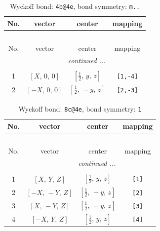 \documentclass[fleqn,8pt]{jsarticle}
\begin{document}
\renewcommand{\arraystretch}{1.2}
\begin{longtable}{cccc}
\caption{Wyckoff bond: {\tt 4b@4e}, bond symmetry: {\tt m..}}
 \\
 \hline \hline
No. & vector & center & mapping \\ \hline \endfirsthead

\multicolumn{3}{l}{\tablename\ \thetable{}} \\
 \hline \hline
No. & vector & center & mapping \\ \hline \endhead

 \hline \hline
\multicolumn{3}{r}{\footnotesize\it continued ...} \\ \endfoot

 \hline \hline
\multicolumn{3}{r}{} \\ \endlastfoot

1 & $\left[ X,\, 0,\, 0 \right]$ & $\left[ \frac{1}{2},\, y,\, z \right]$ & {\tt [1,-4]} \\ \hline
2 & $\left[ - X,\, 0,\, 0 \right]$ & $\left[ \frac{1}{2},\, - y,\, z \right]$ & {\tt [2,-3]} \\
\end{longtable}
\renewcommand{\arraystretch}{1.2}
\begin{longtable}{cccc}
\caption{Wyckoff bond: {\tt 8c@4e}, bond symmetry: {\tt 1}}
 \\
 \hline \hline
No. & vector & center & mapping \\ \hline \endfirsthead

\multicolumn{3}{l}{\tablename\ \thetable{}} \\
 \hline \hline
No. & vector & center & mapping \\ \hline \endhead

 \hline \hline
\multicolumn{3}{r}{\footnotesize\it continued ...} \\ \endfoot

 \hline \hline
\multicolumn{3}{r}{} \\ \endlastfoot

1 & $\left[ X,\, Y,\, Z \right]$ & $\left[ \frac{1}{2},\, y,\, z \right]$ & {\tt [1]} \\ \hline
2 & $\left[ - X,\, - Y,\, Z \right]$ & $\left[ \frac{1}{2},\, - y,\, z \right]$ & {\tt [2]} \\ \hline
3 & $\left[ X,\, - Y,\, Z \right]$ & $\left[ \frac{1}{2},\, - y,\, z \right]$ & {\tt [3]} \\ \hline
4 & $\left[ - X,\, Y,\, Z \right]$ & $\left[ \frac{1}{2},\, y,\, z \right]$ & {\tt [4]} \\
\end{longtable}
\end{document}
